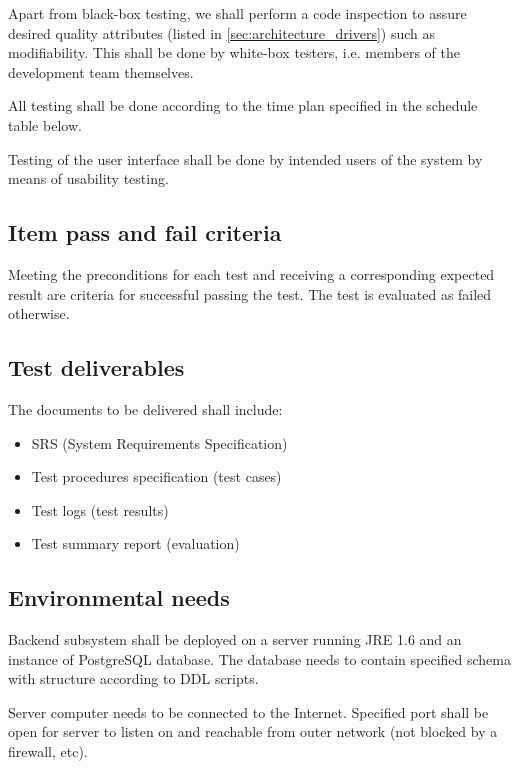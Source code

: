\documentclass[11pt]{book}
\begin{document}
Apart from black-box testing, we shall perform a code inspection to assure desired quality attributes (listed in \ref{sec:architecture_drivers}) such as modifiability. This shall be done by white-box testers, i.e. members of the development team themselves.

All testing shall be done according to the time plan specified in the schedule table below.

Testing of the user interface shall be done by intended users of the system by means of usability testing. %

\subsection{Item pass and fail criteria}
Meeting the preconditions for each test and receiving a corresponding expected result are criteria for successful passing the test. The test is evaluated as failed otherwise.


\subsection{Test deliverables}
The documents to be delivered shall include:

\begin{itemize}
	\item SRS (System Requirements Specification)
	\item Test procedures specification (test cases)
	\item Test logs (test results)
	\item Test summary report (evaluation)
\end{itemize}

\subsection{Environmental needs}
Backend subsystem shall be deployed on a server running JRE 1.6 and an instance of PostgreSQL database. The database needs to contain specified schema with structure according to DDL scripts.

Server computer needs to be connected to the Internet. Specified port shall be open for server to listen on and reachable from outer network (not blocked by a firewall, etc). %
\end{document}

